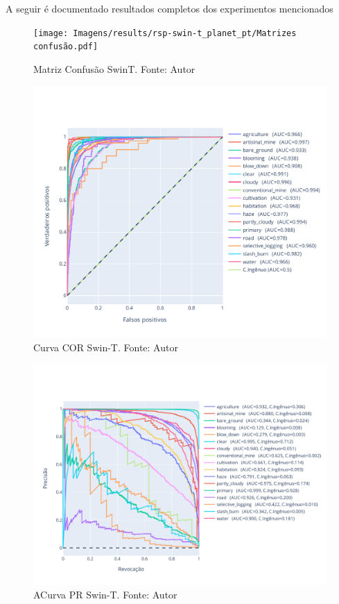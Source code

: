 A seguir é documentado resultados completos dos experimentos mencionados

\begin{figure}[!ht]
    \centering
    \texttt{[image: Imagens/results/rsp-swin-t\_planet\_pt/Matrizes confusão.pdf]}
    \caption{ Matriz Confusão SwinT. Fonte: Autor}
    \label{fig:Matriz Confusao SwinT}
\end{figure}  


\begin{figure}[!ht]
    \centering
    \includegraphics[width=\columnwidth]{Imagens/results/rsp-swin-t_planet_pt/Curva COR por classe.pdf}
    \caption{ Curva COR Swin-T.
    Fonte: Autor}
    \label{fig:AnexosCurvaCORTodasSwin}
\end{figure}    

\begin{figure}[!ht]
    \centering
    \includegraphics[width=\columnwidth]{Imagens/results/rsp-swin-t_planet_pt/Curva PR por classe.pdf}
    \caption{ ACurva PR Swin-T.
    Fonte: Autor}
    \label{fig:AnexosCurvaPRTodasSwin}
\end{figure}  



